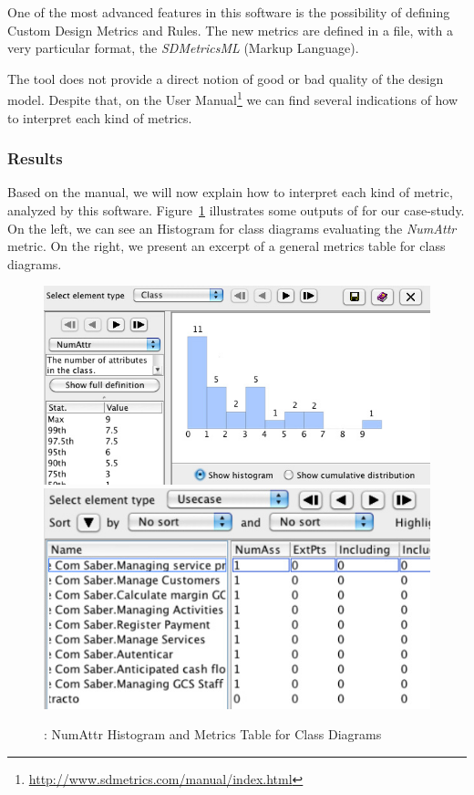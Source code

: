 One of the most advanced features in this software is the possibility of defining Custom Design Metrics and Rules. 
The new metrics are defined in a \xmlS file, with a very particular format, the \textit{SDMetricsML} (\sdmetricsS Markup Language).

The \sdmetricsS tool does not provide a direct notion of good or bad quality of the design model. 
Despite that, on the \sdmetricsS User Manual\footnote{\url{http://www.sdmetrics.com/manual/index.html}} we can find several indications of how to interpret each kind of metrics. 
 
\subsubsection{Results}
Based on the \sdmetricsS manual, we will now explain how to interpret each kind of metric, analyzed by this software. 
Figure~\ref{fig:sdmetrics} illustrates some outputs of \sdmetricsS for our case-study. 
On the left, we can see an Histogram for class diagrams evaluating the \textit{NumAttr} metric. On the right, we present an excerpt of a general metrics table for class diagrams.

\begin{figure}[htbp]
\includegraphics[scale=0.3]{images/histogram2}
\hspace{0.1cm}
\includegraphics[scale=0.32]{images/table3}
\caption{\sdmetricsS: \textsf{NumAttr} Histogram and Metrics Table for Class Diagrams}
\label{fig:sdmetrics}
\end{figure}


